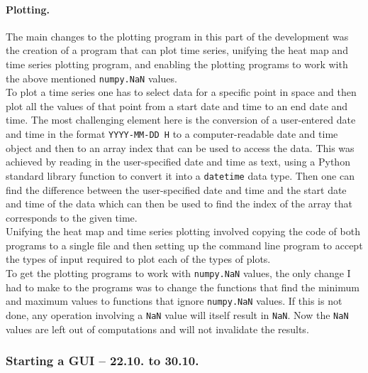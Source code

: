 \documentclass[../00_main.tex]{subfiles}
\begin{document}
\paragraph{Plotting.}

The main changes to the plotting program in this part of the development was
the creation of a program that can plot time series, unifying the heat map and
time series plotting program, and enabling the plotting programs to work with
the above mentioned \texttt{numpy.NaN} values.\\
To plot a time series one has to select data for a specific point in space and
then plot all the values of that point from a start date and time to an end
date and time. The most challenging element here is the conversion of
a user-entered date and time in the format \texttt{YYYY-MM-DD H} to
a computer-readable date and time object and then to an array index that can be
used to access the data. This was achieved by reading in the user-specified
date and time as text, using a Python standard library function to convert it
into a \texttt{datetime} data type. Then one can find the difference between
the user-specified date and time and the start date and time of the data which
can then be used to find the index of the array that corresponds to the given
time. \\
Unifying the heat map and time series plotting involved copying the code of
both programs to a single file and then setting up the command line program to
accept the types of input required to plot each of the types of plots.\\
To get the plotting programs to work with \texttt{numpy.NaN} values, the only
change I had to make to the programs was to change the functions that find the
minimum and maximum values to functions that ignore \texttt{numpy.NaN} values.
If this is not done, any operation involving a \texttt{NaN} value will itself
result in \texttt{NaN}. Now the \texttt{NaN} values are left out of
computations and will not invalidate the results.

\subsubsection{Starting a GUI -- 22.10. to 30.10.}
\end{document}
